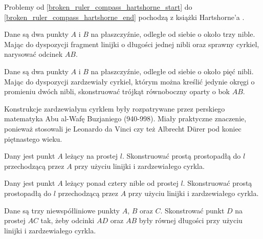 %

Problemy od \ref{broken_ruler_compass_hartshorne_start} do \ref{broken_ruler_compass_hartshorne_end} pochodzą z książki Hartshorne'a \cite[s. 25, 26]{hartshorne2000}.

\begin{problem}
    \label{broken_ruler_compass_hartshorne_start}
    Dane są dwa punkty $A$ i $B$ na płaszczyźnie, odległe od siebie o około trzy nible.
    Mając do dyspozycji fragment linijki o długości jednej nibli oraz sprawny cyrkiel, narysować odcinek $AB$.
\end{problem}

\begin{problem}
    Dane są dwa punkty $A$ i $B$ na płaszczyźnie, odległe od siebie o około pięć nibli.
    Mając do dyspozycji zardzewiały cyrkiel, którym można kreślić jedynie okręgi o promieniu dwóch nibli, skonstruować trójkąt równoboczny oparty o bok $AB$.
\end{problem}

Konstrukcje zardzewiałym cyrklem były rozpatrywane przez perskiego matematyka Abu al-Wafę Buzjaniego (940-998).
Miały praktyczne znaczenie, ponieważ stosowali je Leonardo da Vinci czy też Albrecht Dürer pod koniec piętnastego wieku.
%
%
%

\begin{problem}
    Dany jest punkt $A$ leżący na prostej $l$.
    Skonstruować prostą prostopadłą do $l$ przechodzącą przez $A$ przy użyciu linijki i zardzewiałego cyrkla.
\end{problem}

\begin{problem}
    Dany jest punkt $A$ leżący ponad cztery nible od prostej $l$.
    Skonstruować prostą prostopadłą do $l$ przechodzącą przez $A$ przy użyciu linijki i zardzewiałego cyrkla.
\end{problem}

\begin{problem}
    Dane są trzy niewspółliniowe punkty $A$, $B$ oraz $C$.
    Skonstrować punkt $D$ na prostej $AC$ tak, żeby odcinki $AD$ oraz $AB$ były równej długości przy użyciu linijki i zardzewiałego cyrkla.
\end{problem}

